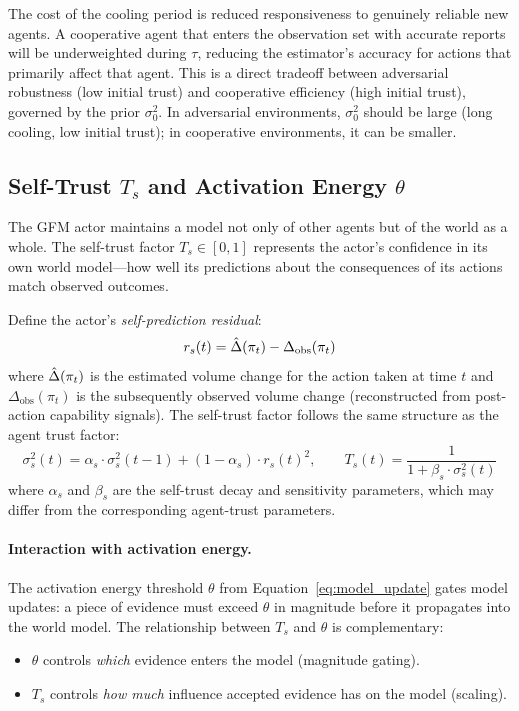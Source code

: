 The cost of the cooling period is reduced responsiveness to genuinely reliable new agents. A cooperative agent that enters the observation set with accurate reports will be underweighted during $\tau$, reducing the estimator's accuracy for actions that primarily affect that agent. This is a direct tradeoff between adversarial robustness (low initial trust) and cooperative efficiency (high initial trust), governed by the prior $\sigma_0^2$. In adversarial environments, $\sigma_0^2$ should be large (long cooling, low initial trust); in cooperative environments, it can be smaller.


\subsection{Self-Trust \texorpdfstring{$T_s$}{T\_s} and Activation Energy \texorpdfstring{$\theta$}{theta}}
\label{app:self_trust}

The GFM actor maintains a model not only of other agents but of the world as a whole. The self-trust factor $T_s \in [0, 1]$ represents the actor's confidence in its own world model---how well its predictions about the consequences of its actions match observed outcomes.

Define the actor's \emph{self-prediction residual}:
\begin{equation}
\label{eq:self_residual}
r_s(t) = \hat{\Delta}(\pi_t) - \Delta_{\mathrm{obs}}(\pi_t)
\end{equation}
where $\hat{\Delta}(\pi_t)$ is the estimated volume change for the action taken at time $t$ and $\Delta_{\mathrm{obs}}(\pi_t)$ is the subsequently observed volume change (reconstructed from post-action capability signals). The self-trust factor follows the same structure as the agent trust factor:
\begin{equation}
\label{eq:self_trust}
\sigma_s^2(t) = \alpha_s \cdot \sigma_s^2(t-1) + (1 - \alpha_s) \cdot r_s(t)^2, \qquad T_s(t) = \frac{1}{1 + \beta_s \cdot \sigma_s^2(t)}
\end{equation}
where $\alpha_s$ and $\beta_s$ are the self-trust decay and sensitivity parameters, which may differ from the corresponding agent-trust parameters.

\paragraph{Interaction with activation energy.} The activation energy threshold $\theta$ from Equation~\eqref{eq:model_update} gates model updates: a piece of evidence must exceed $\theta$ in magnitude before it propagates into the world model. The relationship between $T_s$ and $\theta$ is complementary:
\begin{itemize}
\item $\theta$ controls \emph{which} evidence enters the model (magnitude gating).
\item $T_s$ controls \emph{how much} influence accepted evidence has on the model (scaling).
\end{itemize}

